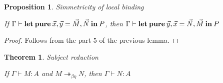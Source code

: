 \documentclass[a4paper]{article}
\newtheorem{theorem}{Theorem}
\newtheorem{prop}{Proposition}
\begin{document}
\begin{prop} Simmetricity of local binding

  If $\Gamma \vdash {\bf let \: pure \:} \vec{x}, \vec{y} = \vec{M}, \vec{N} {\: \bf in \:} P$, then
  $\Gamma \vdash {\bf let \: pure \:} \vec{y}, \vec{x} = \vec{N}, \vec{M} {\: \bf in \:} P$
\end{prop}

\begin{proof}

  Follows from the part 5 of the previous lemma.
\end{proof}

\begin{theorem} Subject reduction

  If $\Gamma \vdash M : A$ and $M \twoheadrightarrow_{\beta \eta} N$, then $\Gamma \vdash N : A$

\end{theorem}
\end{document}
